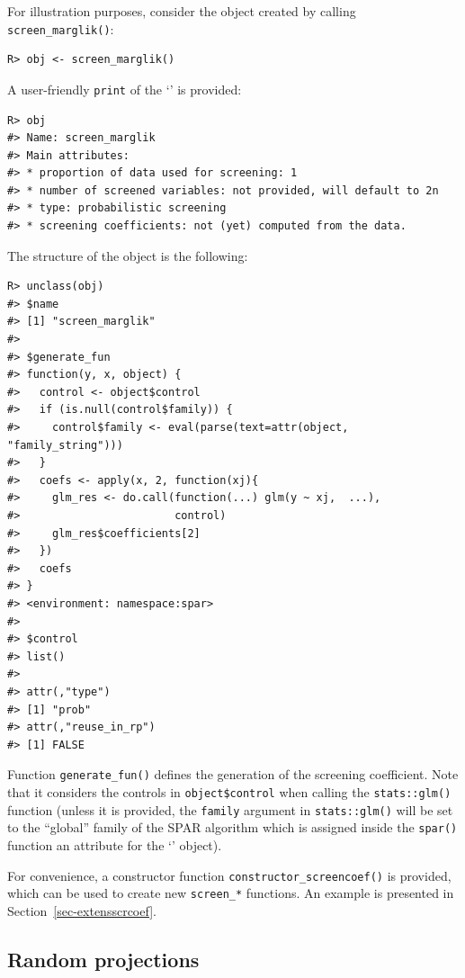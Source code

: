 \documentclass[
  article,
  nojss]{jss}
\newcommand{\class}[1]{`\code{#1}'}
\begin{document}
For illustration purposes, consider the object created by calling
\texttt{screen\_marglik()}:

\begin{verbatim}
R> obj <- screen_marglik()
\end{verbatim}

A user-friendly \texttt{print} of the \class{screencoef} is provided:

\begin{verbatim}
R> obj
#> Name: screen_marglik 
#> Main attributes: 
#> * proportion of data used for screening: 1 
#> * number of screened variables: not provided, will default to 2n 
#> * type: probabilistic screening 
#> * screening coefficients: not (yet) computed from the data.
\end{verbatim}

The structure of the object is the following:

\begin{verbatim}
R> unclass(obj)
#> $name
#> [1] "screen_marglik"
#> 
#> $generate_fun
#> function(y, x, object) {
#>   control <- object$control
#>   if (is.null(control$family)) {
#>     control$family <- eval(parse(text=attr(object, "family_string")))
#>   }
#>   coefs <- apply(x, 2, function(xj){
#>     glm_res <- do.call(function(...) glm(y ~ xj,  ...),
#>                        control)
#>     glm_res$coefficients[2]
#>   })
#>   coefs
#> }
#> <environment: namespace:spar>
#> 
#> $control
#> list()
#> 
#> attr(,"type")
#> [1] "prob"
#> attr(,"reuse_in_rp")
#> [1] FALSE
\end{verbatim}

Function \texttt{generate\_fun()} defines the generation of the
screening coefficient. Note that it considers the controls in
\texttt{object\$control} when calling the \texttt{stats::glm()} function
(unless it is provided, the \texttt{family} argument in
\texttt{stats::glm()} will be set to the ``global'' family of the SPAR
algorithm which is assigned inside the \texttt{spar()} function an
attribute for the \class{screencoef} object).

For convenience, a constructor function
\texttt{constructor\_screencoef()} is provided, which can be used to
create new \texttt{screen\_*} functions. An example is presented in
Section~\ref{sec-extensscrcoef}.

\subsection{Random projections}\label{random-projections}
\end{document}
